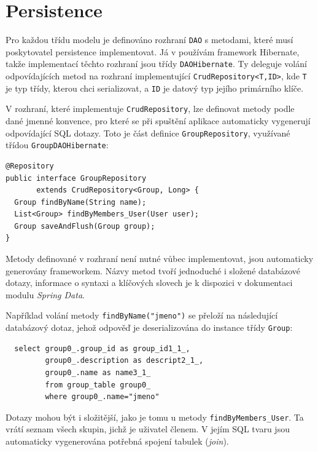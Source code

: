 \documentclass[thesis=B,czech]{FITthesis}[2012/06/26]
\begin{document}
		
		
	\section{Persistence}
		Pro každou třídu modelu je definováno rozhraní \texttt{DAO} s metodami, které musí poskytovatel persistence implementovat. Já v používám framework Hibernate, takže implementací těchto rozhraní jsou třídy \texttt{DAOHibernate}. Ty deleguje volání odpovídajících metod na rozhraní implementující \texttt{CrudRepository<T,ID>}, kde \texttt{T} je typ třídy, kterou chci serializovat, a \texttt{ID} je datový typ jejího primárního klíče.
		
		V rozhraní, které implementuje \texttt{CrudRepository}, lze definovat metody podle dané jmenné konvence, pro které se při spuštění aplikace automaticky vygenerují odpovídající SQL dotazy. Toto je část definice \texttt{GroupRepository}, využívané třídou \texttt{GroupDAOHibernate}:
		\begin{Verbatim}
@Repository
public interface GroupRepository 
       extends CrudRepository<Group, Long> {
  Group findByName(String name);
  List<Group> findByMembers_User(User user);
  Group saveAndFlush(Group group);
}
		\end{Verbatim}
		
	Metody definované v rozhraní není nutné vůbec implementovat, jsou automaticky generovány frameworkem. Názvy metod tvoří jednoduché i složené databázové dotazy, informace o syntaxi a klíčových slovech je k dispozici v dokumentaci modulu \textit{Spring Data}. \cite{dao-query-methods}
	
	Například volání metody \texttt{findByName("jmeno")} se přeloží na následující databázový dotaz, jehož odpověď je deserializována do instance třídy \texttt{Group}:
	\begin{Verbatim}
  select group0_.group_id as group_id1_1_, 
         group0_.description as descript2_1_, 
         group0_.name as name3_1_ 
         from group_table group0_ 
         where group0_.name="jmeno"
	\end{Verbatim}
	
	Dotazy mohou být i složitější, jako je tomu u metody \texttt{findByMembers\_User}. Ta vrátí seznam všech skupin, jichž je uživatel členem. V jejím  SQL tvaru jsou automaticky vygenerována potřebná spojení tabulek (\textit{join}).
	
\end{document}
